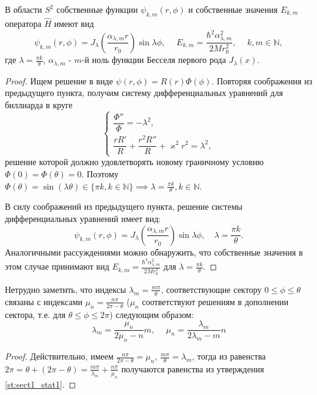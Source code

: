 \begin{statement} \cite[p.~4]{wref13}
В области $S^2$ собственные функции $\psi_{k, m}(r, \phi)$ и собственные значения $E_{k, m}$ оператора $\hat{H}$ имеют вид 
$$\psi_{k, m}(r, \phi) = J_\lambda\left(\frac{\alpha_{\lambda, m}r}{r_0}\right)\sin{\lambda\phi}, \hspace{15pt} E_{k, m} = \frac{\hbar^2 \alpha_{\lambda, m}^2}{2Mr_0^2}, \hspace{15pt} k, m \in \mathbb{N},$$
где $\lambda = \frac{\pi k}{\theta}$, $\alpha_{\lambda, m}$ - $m$-й ноль функции Бесселя первого рода $J_\lambda(x)$.
\label{st:sect1_stat1}
\end{statement}
\begin{proof}
Ищем решение в виде $\psi(r, \phi) = R(r)\Phi(\phi)$. Повторяя соображения из предыдущего пункта, получим систему дифференциальных уравнений для биллиарда в круге 
\[
\left\{\begin{array}{cc}
    \dfrac{\Phi''}{\Phi} =-\lambda^2, \\
    \dfrac{rR'}{R} + \dfrac{r^2R''}{R} + \varkappa^2r^2 = \lambda^2,
\end{array}
\right.
\]
решение которой должно удовлетворять новому граничному условию $\Phi(0)=\Phi(\theta)=0$. Поэтому $\Phi(\theta) = \sin(\lambda \theta) \in \{\pi k, k \in \mathbb{N}\} \implies \lambda = \frac{\pi k}{\theta}, k \in \mathbb{N}$.

В силу соображений из предыдущего пункта, решение системы дифференциальных уравнений имеет вид:
$$\psi_{k, m}(r, \phi) = J_\lambda\left(\frac{\alpha_{\lambda, m}r}{r_0}\right)\sin{\lambda\phi} , \quad \lambda=\frac{\pi k}{\theta}.$$
Аналогичными рассуждениями можно обнаружить, что собственные значения в этом случае принимают вид 
$E_{k, m} = \frac{\hbar^2 \alpha_{\lambda, m}^2}{2Mr_0^2}$ для $\lambda=\frac{\pi k}{\theta}.$
\end{proof}

\begin{consequence} \cite[p.~4]{wref13}
Нетрудно заметить, что индексы $\lambda_m = \frac{m \pi}{\theta}$, соответствующие сектору $0 \leq \phi \leq \theta$ связаны с индексами $\mu_n = \frac{n \pi}{2\pi - \theta}$ ($\mu_n$ соответствуют решениям в дополнении сектора, т.е. для $\theta \leq \phi \leq 2\pi$) следующим образом:
$$\lambda_m = \frac{\mu_n}{2\mu_n - n}m, \hspace{15pt} \mu_n = \frac{\lambda_m}{2\lambda_m - m}n$$
\end{consequence}
\begin{proof}
Действительно, имеем 
$\frac{n \pi}{2\pi - \theta} = \mu_n$, $\frac{m \pi}{\theta} = \lambda_m$, тогда из равенства $2\pi = \theta + (2\pi - \theta) = \frac{m \pi}{\lambda_m} + \frac{n \pi}{\mu_n}$ получаются равенства из утверждения \ref{st:sect1_stat1}.
\end{proof}

